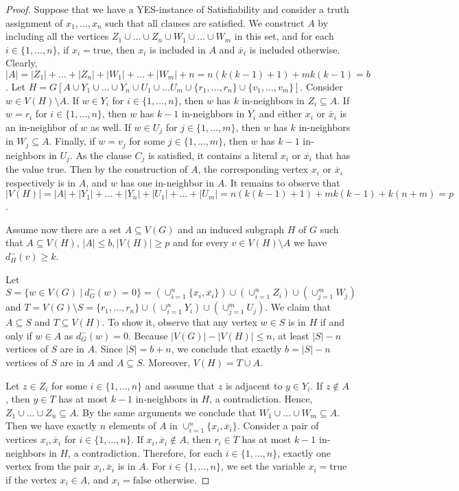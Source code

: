 \documentclass[11pt,a4paper]{article}
\begin{document}
\begin{proof}
Suppose that we have a YES-instance of {\sc Satisfiability} and consider a truth assignment of $x_1,\ldots,x_n$ such that
all clauses are satisfied. We construct $A$ by including all the vertices $Z_1\cup\ldots\cup Z_n\cup W_1\cup\ldots\cup W_m$ in
this set, and for each $i\in\{1,\ldots,n\}$, if $x_i=\text{true}$, then $x_i$ is included in $A$ and $\overline{x}_i$ is
included otherwise. Clearly, $|A|=|Z_1|+\ldots+|Z_n|+|W_1|+\ldots+|W_m|+n=n(k(k-1)+1)+mk(k-1)=b$. Let $H=G[A\cup
Y_1\cup\ldots\cup Y_n\cup U_1\cup\ldots U_m\cup\{r_1,\ldots,r_n\}\cup\{v_1,\ldots,v_m\}]$. Consider $w\in V(H)\setminus A$. If
$w\in Y_i$ for $i\in\{1,\ldots,n\}$, then $w$ has $k$ in-neighbors in $Z_i\subseteq A$. If $w=r_i$ for $i\in\{1,\ldots,n\}$,
then $w$ has $k-1$ in-neighbors in $Y_i$ and either $x_i$ or $\overline{x}_i$ is an in-neighbor of $w$ as well. If $w\in U_j$
for $j\in\{1,\ldots,m\}$, then $w$ has $k$ in-neighbors in $W_j\subseteq A$. Finally, if $w=v_j$ for some
$j\in\{1,\ldots,m\}$, then $w$ has $k-1$ in-neighbors in $U_j$. As the clause $C_j$ is satisfied, it contains a literal $x_i$
or $\overline{x_i}$ that has the value $\text{true}$. Then by the construction of $A$, the corresponding vertex $x_i$ or
$\overline{x}_i$ respectively is in $A$, and $w$ has one in-neighbor in $A$. It remains to observe that
$|V(H)|=|A|+|Y_1|+\ldots+|Y_n|+|U_1|+\ldots+|U_m|=n(k(k-1)+1)+mk(k-1)+k(n+m)=p$.

Assume now there are a set $A\subseteq V(G)$
and an induced subgraph $H$ of $G$ such
that $A\subseteq V(H)$, $|A|\leq b, |V(H)|\geq p$ and for every $v\in V(H)\setminus A$ we have $d^{-}_{H}(v)\geq k$.

Let $S=\{w\in V(G)\ |\ d_G^-(w)=0\}=(\cup_{i=1}^n\{x_i,\overline{x_i}\})\cup (\cup_{i=1}^nZ_i)\cup(\cup_{j=1}^mW_j)$ and
$T=V(G)\setminus S=\{r_1,\ldots,r_n\}\cup (\cup_{i=1}^nY_i)\cup(\cup_{j=1}^mU_j)$. 
 We claim that
$A\subseteq S$ and $T\subseteq V(H)$. To show it, observe that any vertex $w\in S$ is in $H$ if and only if $w\in A$ as
$d_G^-(w)=0$. Because $|V(G)|-|V(H)|\leq n$, at least $|S|-n$ vertices of $S$ are in $A$. Since $|S|=b+n$, we conclude that
exactly $b=|S|-n$ vertices of $S$ are in $A$ and $A\subseteq S$. Moreover, $V(H)=T\cup A$.

Let $z\in Z_i$ for some $i\in\{1,\ldots,n\}$ and assume that $z$ is adjacent to $y\in Y_i$. If $z\notin A$, then $y\in T$ has
at most $k-1$ in-neighbors in $H$, a contradiction. Hence, $Z_1\cup\ldots\cup Z_n\subseteq A$. By the same arguments we
conclude that $W_1\cup\ldots\cup W_m\subseteq A$. Then we have exactly $n$ elements of $A$ in
$\cup_{i=1}^n\{x_i,\overline{x}_i\}$. Consider a pair of vertices $x_i,\overline{x}_i$ for $i\in\{1,\ldots,n\}$. If
$x_i,\overline{x}_i\notin A$, then $r_i\in T$ has at most $k-1$ in-neighbors in $H$, a contradiction. Therefore, for each
$i\in\{1,\ldots,n\}$, exactly one vertex from the pair  $x_i, \overline{x}_i$ is in $A$. For $i\in\{1,\ldots,n\}$, we set the
variable $x_i=\text{true}$ if the vertex $x_i\in A$, and $x_i=\text{false}$ otherwise.


\end{proof}
\end{document}
